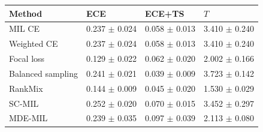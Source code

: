 \begin{tabular}{llll}
\toprule
Method & ECE & ECE+TS & $T$\\
\midrule
MIL CE & \num{0.237} $\pm$ \num{0.024} & \num{0.058} $\pm$ \num{0.013} & \num{3.410} $\pm$ \num{0.240}\\
Weighted CE & \num{0.237} $\pm$ \num{0.024} & \num{0.058} $\pm$ \num{0.013} & \num{3.410} $\pm$ \num{0.240}\\
Focal loss & \num{0.129} $\pm$ \num{0.022} & \num{0.062} $\pm$ \num{0.020} & \num{2.002} $\pm$ \num{0.166}\\
Balanced sampling & \num{0.241} $\pm$ \num{0.021} & \num{0.039} $\pm$ \num{0.009} & \num{3.723} $\pm$ \num{0.142}\\
RankMix & \num{0.144} $\pm$ \num{0.009} & \num{0.045} $\pm$ \num{0.020} & \num{1.530} $\pm$ \num{0.029}\\
SC-MIL & \num{0.252} $\pm$ \num{0.020} & \num{0.070} $\pm$ \num{0.015} & \num{3.452} $\pm$ \num{0.297}\\
MDE-MIL & \num{0.239} $\pm$ \num{0.035} & \num{0.097} $\pm$ \num{0.039} & \num{2.113} $\pm$ \num{0.080}\\
\bottomrule
\end{tabular}
